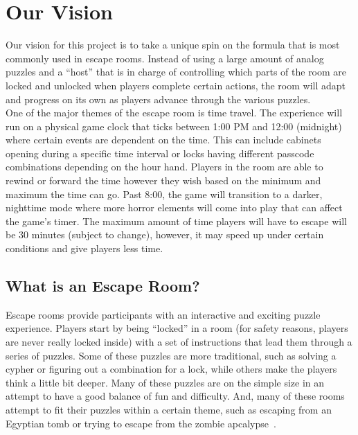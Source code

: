 \documentclass[conference]{IEEEtran}
\begin{document}
\section{Our Vision}
Our vision for this project is to take a unique spin on the formula that is most commonly used in escape rooms.
Instead of using a large amount of analog puzzles and a ``host'' that is in charge of controlling which parts of
the room are locked and unlocked when players complete certain actions, the room will adapt and progress on its
own as players advance through the various puzzles.
\\
\indent One of the major themes of the escape room is time travel. The experience will run
on a physical game clock that ticks between 1:00 PM and 12:00 (midnight) where certain events are
dependent on the time. This can include cabinets opening during a specific time interval or
locks having different passcode combinations depending on the hour hand. Players in the
room are able to rewind or forward the time however they wish based on the minimum and
maximum the time can go. Past 8:00, the game will transition to a darker, nighttime mode where
more horror elements will come into play that can affect the game's timer. The maximum amount 
of time players will have to escape will be 30 minutes (subject to change), however, it may speed up under
certain conditions and give players less time.

\subsection*{What is an Escape Room?}
Escape rooms provide participants with an interactive and exciting puzzle experience. 
Players start by being ``locked'' in a room (for safety reasons, players are never really
locked inside) with a set of instructions that lead them through a series of puzzles. Some of
these puzzles are more traditional, such as solving a cypher or figuring out a combination for a lock,
while others make the players think a little bit deeper. Many of these puzzles are on the simple size in
an attempt to have a good balance of fun and difficulty. And, many of these rooms attempt to fit their
puzzles within a certain theme, such as escaping from an Egyptian tomb or trying to escape from the zombie
apcalypse~\cite{wikipediaEscapeRoom}.
\end{document}
